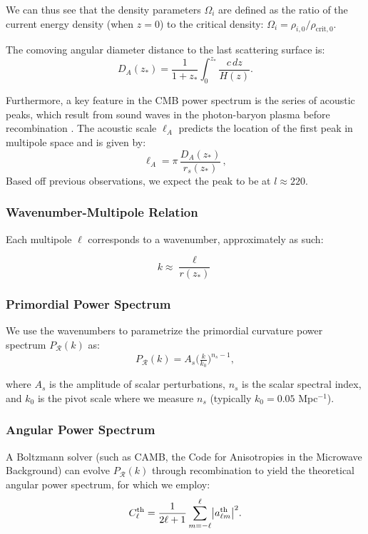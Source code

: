 \documentclass[11pt]{article}
\theoremstyle{definition}
\begin{document}
  We can thus see that the density
  parameters $\Omega_i$ are defined as the ratio of the current energy density (when \( z = 0\)) to the critical density: $\Omega_i =
  \rho_{i,0}/\rho_{\mathrm{crit},0}$.

The comoving angular diameter distance to the last scattering surface is:
\begin{equation}
  D_A(z_*) 
  = \frac{1}{1+z_*}\int_0^{z_*}\frac{c\,dz}{H(z)}.
\end{equation}

Furthermore, a key feature in the CMB power spectrum is the series of acoustic peaks, which result from sound waves in the photon-baryon plasma before recombination \cite{hu2002}. The acoustic scale $\ell_A$ predicts the location of the first peak in multipole space and is given by:
\begin{equation}
  \ell_A = \pi\,\frac{D_A(z_*)}{r_s(z_*)}\,,
\end{equation}
Based off previous observations, we expect the peak to be at $l\approx 220$.

\subsubsection{Wavenumber-Multipole Relation}
Each multipole $\ell$ corresponds to a wavenumber, approximately as such:

\begin{equation}
k \approx \frac{\ell}{r(z_*)}
\end{equation}

\subsubsection{Primordial Power Spectrum}
We use the wavenumbers to parametrize the primordial curvature power spectrum $P_{\mathcal{R}}(k)$ as:
\begin{equation}
  P_{\mathcal R}(k)
  = A_s\bigl(\tfrac{k}{k_0}\bigr)^{n_s-1},
\end{equation}

where $A_s$ is the amplitude of scalar perturbations, $n_s$ is the scalar spectral index, and \(k_0\) is the pivot scale where we measure $n_s$ (typically $k_0 = 0.05$ Mpc$^{-1}$).


\subsubsection{Angular Power Spectrum}
A Boltzmann solver (such as CAMB, the Code for Anisotropies in the Microwave Background) can evolve 
\(P_{\mathcal R}(k)\)
through recombination to yield the theoretical angular power spectrum, for which we employ:
\begin{equation}
  C_\ell^{\rm th}
  = \frac{1}{2\ell+1}\sum_{m=-\ell}^{\ell}\bigl|a_{\ell m}^{\rm th}\bigr|^2.
\end{equation}
\end{document}

